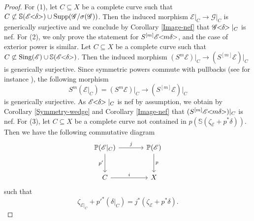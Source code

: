 \documentclass[english,reqno]{amsart}
\newcommand\bbP{{\mathbb P}}
\newcommand\bbS{{\mathbb S}}
\newcommand\sE{{\mathscr E}}
\newcommand\sG{{\mathscr G}}
\DeclareMathOperator*{\supp}{Supp}
\theoremstyle{plain}
\theoremstyle{definition}
\numberwithin{equation}{section} %
\begin{document}
\begin{proof}
    For (1), let $C\subseteq X$ be a complete curve such that $C\not\subset \bbS(\sE\hspace{-0.8ex}<\hspace{-0.8ex}\delta\hspace{-0.8ex}>)\cup \supp(\sG/\sigma(\sG))$. Then the induced morphism $\sE\vert_C\rightarrow \sG\vert_C$ is generically surjective and we conclude by Corollary \ref{Image-nef} that $\sG\hspace{-0.8ex}<\hspace{-0.8ex}\delta\hspace{-0.8ex}>\vert_C$ is nef.
    For (2), we only prove the statement for $S^{[m]}\sE\hspace{-0.8ex}<\hspace{-0.8ex}m\delta\hspace{-0.8ex}>$, and the case of exterior power is similar. Let $C\subseteq X$ be a complete  curve such that $C\not\subset \mathrm{Sing}(\sE)\cup \bbS(\sE\hspace{-0.8ex}<\hspace{-0.8ex}\delta\hspace{-0.8ex}>)$. Then  the induced morphism $(S^m\sE)\vert_C\rightarrow (S^{[m]}\sE)\vert_C$ is generically surjective. Since   symmetric powers commute with pullbacks (see for instance \cite[II, Exercise 5.16]{Hartshorne1977}), the following morphism
    \[S^m(\sE\vert_C)=(S^m\sE)\vert_C\rightarrow (S^{[m]}\sE)\vert_C \]
    is generically surjective. As $\sE\hspace{-0.8ex}<\hspace{-0.8ex}\delta\hspace{-0.8ex}>\vert_C$ is nef by assumption, we obtain by Corollary \ref{Symmetry-wedge} and Corollary \ref{Image-nef} that $(S^{[m]}\sE\hspace{-0.8ex}<\hspace{-0.8ex}m\delta\hspace{-0.8ex}>)\vert_C$ is nef.
    For (3), let $C\subseteq X$ be a complete curve  not contained in  $p(\bbS(\zeta_{\sE}+p^*\delta))$. Then we have the following commutative diagram
    \[\begin{tikzcd}[column sep=large, row sep=large]
        \bbP(\sE|_C)\dar[swap]{p'}\ar[r,"{j}"] & \bbP(\sE)\ar[d,"{p}"]\\
        C\ar[r,"{i}"]                        & X
      \end{tikzcd}
    \]
    such that
    \[\zeta_{\sE|_C}+p'^*(\delta\vert_C)=j^*(\zeta_{\sE}+p^*\delta).\]

\end{proof}
\end{document}

